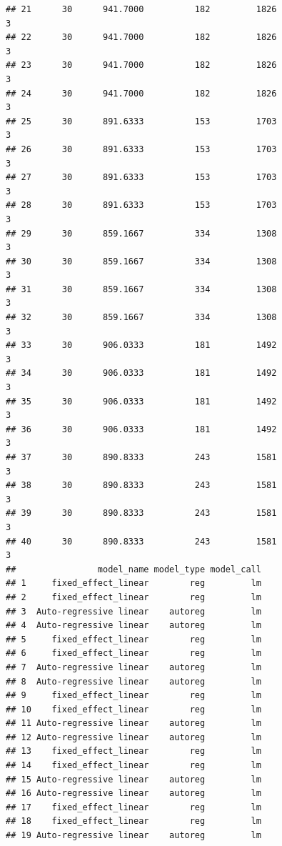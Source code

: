 \documentclass[
]{article}
\begin{document}
\begin{verbatim}
## 21      30      941.7000          182         1826                        3
## 22      30      941.7000          182         1826                        3
## 23      30      941.7000          182         1826                        3
## 24      30      941.7000          182         1826                        3
## 25      30      891.6333          153         1703                        3
## 26      30      891.6333          153         1703                        3
## 27      30      891.6333          153         1703                        3
## 28      30      891.6333          153         1703                        3
## 29      30      859.1667          334         1308                        3
## 30      30      859.1667          334         1308                        3
## 31      30      859.1667          334         1308                        3
## 32      30      859.1667          334         1308                        3
## 33      30      906.0333          181         1492                        3
## 34      30      906.0333          181         1492                        3
## 35      30      906.0333          181         1492                        3
## 36      30      906.0333          181         1492                        3
## 37      30      890.8333          243         1581                        3
## 38      30      890.8333          243         1581                        3
## 39      30      890.8333          243         1581                        3
## 40      30      890.8333          243         1581                        3
##                model_name model_type model_call
## 1     fixed_effect_linear        reg         lm
## 2     fixed_effect_linear        reg         lm
## 3  Auto-regressive linear    autoreg         lm
## 4  Auto-regressive linear    autoreg         lm
## 5     fixed_effect_linear        reg         lm
## 6     fixed_effect_linear        reg         lm
## 7  Auto-regressive linear    autoreg         lm
## 8  Auto-regressive linear    autoreg         lm
## 9     fixed_effect_linear        reg         lm
## 10    fixed_effect_linear        reg         lm
## 11 Auto-regressive linear    autoreg         lm
## 12 Auto-regressive linear    autoreg         lm
## 13    fixed_effect_linear        reg         lm
## 14    fixed_effect_linear        reg         lm
## 15 Auto-regressive linear    autoreg         lm
## 16 Auto-regressive linear    autoreg         lm
## 17    fixed_effect_linear        reg         lm
## 18    fixed_effect_linear        reg         lm
## 19 Auto-regressive linear    autoreg         lm

\end{verbatim}
\end{document}
